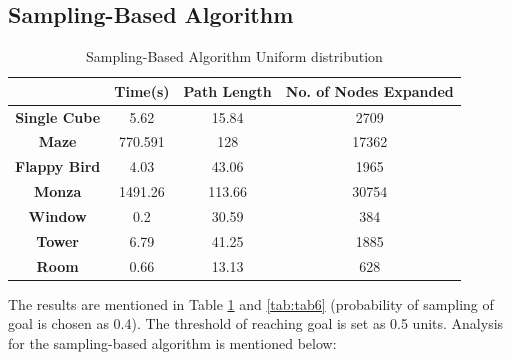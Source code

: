 \documentclass[conference]{IEEEtran}
\begin{document}
\subsection{Sampling-Based Algorithm}
\begin{table}
    \centering
    \caption{Sampling-Based Algorithm Uniform distribution}
    \label{tab:tab5}
    \begin{tabular}{|c|c|c|c|}
    \hline
    & \textbf{Time(s)} & \textbf{Path Length} & \textbf{No. of Nodes Expanded} \\ \hline
    \textbf{Single Cube} & 5.62 & 15.84 & 2709 \\ \hline
    \textbf{Maze} & 770.591 & 128 & 17362 \\ \hline
    \textbf{Flappy Bird} & 4.03 & 43.06 & 1965 \\ \hline
    \textbf{Monza} & 1491.26 & 113.66 & 30754 \\ \hline
    \textbf{Window} & 0.2 & 30.59 & 384 \\ \hline
    \textbf{Tower} & 6.79 & 41.25 & 1885 \\ \hline
    \textbf{Room} & 0.66 & 13.13 & 628 \\ \hline
    \end{tabular}
    \end{table}
The results are mentioned in Table \ref{tab:tab5} and \ref{tab:tab6} (probability of sampling of goal is chosen as 0.4). The threshold of reaching goal is set as 0.5 units. Analysis for the sampling-based algorithm is mentioned below:
\end{document}
